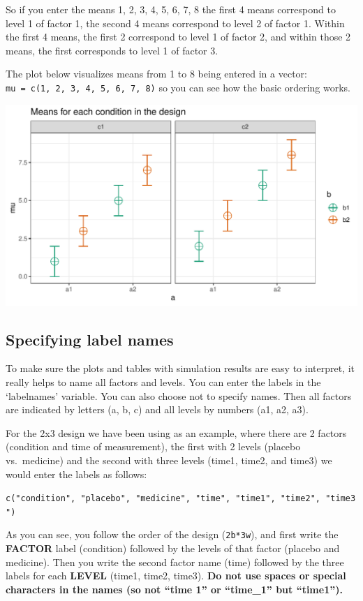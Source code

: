 \documentclass[
]{book}
\begin{document}
So if you enter the means 1, 2, 3, 4, 5, 6, 7, 8 the first 4 means correspond to level 1 of factor 1, the second 4 means correspond to level 2 of factor 1. Within the first 4 means, the first 2 correspond to level 1 of factor 2, and within those 2 means, the first corresponds to level 1 of factor 3.

The plot below visualizes means from 1 to 8 being entered in a vector: \texttt{mu\ =\ c(1,\ 2,\ 3,\ 4,\ 5,\ 6,\ 7,\ 8)} so you can see how the basic ordering works.

\includegraphics{SuperpowerValidation_files/figure-latex/unnamed-chunk-2-1.pdf}

\hypertarget{specifying-label-names}{%
\subsection{Specifying label names}\label{specifying-label-names}}

To make sure the plots and tables with simulation results are easy to interpret, it really helps to name all factors and levels. You can enter the labels in the `labelnames' variable. You can also choose not to specify names. Then all factors are indicated by letters (a, b, c) and all levels by numbers (a1, a2, a3).

For the 2x3 design we have been using as an example, where there are 2 factors (condition and time of measurement), the first with 2 levels (placebo vs.~medicine) and the second with three levels (time1, time2, and time3) we would enter the labels as follows:

\texttt{c("condition",\ "placebo",\ "medicine",\ "time",\ "time1",\ "time2",\ "time3")}

As you can see, you follow the order of the design (\texttt{2b*3w}), and first write the \textbf{FACTOR} label (condition) followed by the levels of that factor (placebo and medicine). Then you write the second factor name (time) followed by the three labels for each \textbf{LEVEL} (time1, time2, time3). \textbf{Do not use spaces or special characters in the names (so not ``time 1'' or ``time\_1'' but ``time1'').}
\end{document}
